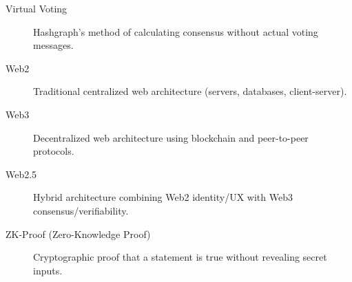 \begin{description}
\item[Virtual Voting] Hashgraph's method of calculating consensus without actual voting messages.

\item[Web2] Traditional centralized web architecture (servers, databases, client-server).

\item[Web3] Decentralized web architecture using blockchain and peer-to-peer protocols.

\item[Web2.5] Hybrid architecture combining Web2 identity/UX with Web3 consensus/verifiability.

\item[ZK-Proof (Zero-Knowledge Proof)] Cryptographic proof that a statement is true without revealing secret inputs.
\end{description}